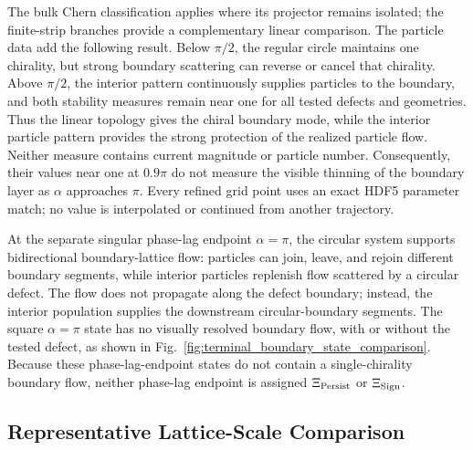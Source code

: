 \documentclass[11pt]{article}
\numberwithin{equation}{section}
\begin{document}
The bulk Chern classification applies where its projector remains isolated;
the finite-strip branches provide a complementary linear comparison.
The particle data add the
following result.  Below $\pi/2$, the regular circle maintains one chirality,
but strong boundary scattering can reverse or cancel that chirality.  Above
$\pi/2$, the interior pattern continuously supplies particles to the boundary,
and both stability measures remain near one for all tested defects and
geometries.  Thus the linear topology gives the chiral boundary mode, while the
interior particle pattern provides the strong protection of the realized
particle flow.  Neither measure contains current magnitude or particle number.
Consequently, their values near one at $0.9\pi$ do not measure the visible
thinning of the boundary layer as $\alpha$ approaches $\pi$.  Every refined
grid point uses an exact HDF5 parameter match; no value is interpolated or
continued from another trajectory.

At the separate singular phase-lag endpoint $\alpha=\pi$, the circular system supports
bidirectional boundary-lattice flow: particles can join, leave, and rejoin
different boundary segments, while interior particles replenish flow scattered
by a circular defect.  The flow does not propagate along the defect boundary;
instead, the interior population supplies the downstream circular-boundary
segments.  The square $\alpha=\pi$ state has no visually resolved boundary flow, with or
without the tested defect, as shown in
Fig.~\ref{fig:terminal_boundary_state_comparison}.  Because these phase-lag-endpoint
states do not contain a single-chirality boundary flow, neither phase-lag endpoint is
assigned $\Xi_{\rm Persist}$ or $\Xi_{\rm Sign}$.

\subsection{Representative Lattice-Scale Comparison}
\end{document}
